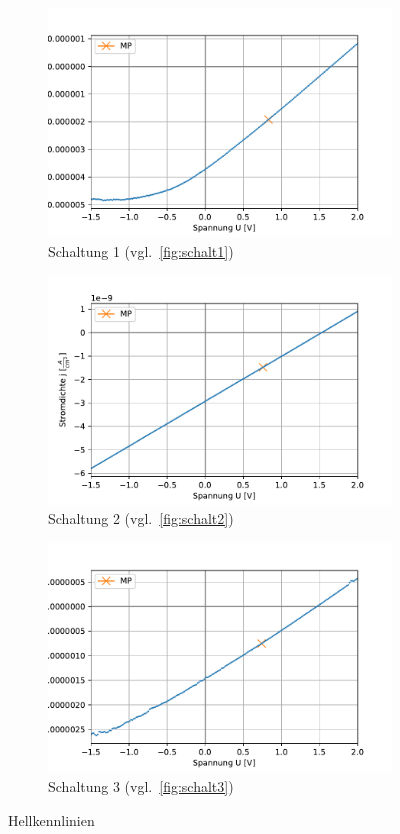 \documentclass[slug=SZ, room=Hermann-Krone-Bau\,\ Labor\ 1.25, supervisor=Martin\ Kroll]{../../Lab_Report_LaTeX/lab_report}
\begin{document}
\begin{figure}[H]\centering
\begin{subfigure}[b]{1\textwidth}\centering
        \includegraphics[width=.5\columnwidth]{figs/python/C/3x3_schaltung_2.pdf}
        \caption{Schaltung 1 (vgl.~\ref{fig:schalt1})}
        \label{diag:hellschalt1}
\end{subfigure}
\begin{subfigure}[b]{1\textwidth}\centering
        \includegraphics[width=.5\columnwidth]{figs/python/C/3x3_schaltung_3.pdf}
        \caption{Schaltung 2 (vgl.~\ref{fig:schalt2})}
        \label{diag:hellschalt2}
\end{subfigure}
\begin{subfigure}[b]{1\textwidth}\centering
        \includegraphics[width=.5\columnwidth]{figs/python/C/3x3_schaltung_4.pdf}
        \caption{Schaltung 3 (vgl.~\ref{fig:schalt3})}
        \label{diag:hellschalt3}
\end{subfigure}
        \caption{Hellkennlinien}
        \label{fig:hellkenn}
\end{figure}
\end{document}
